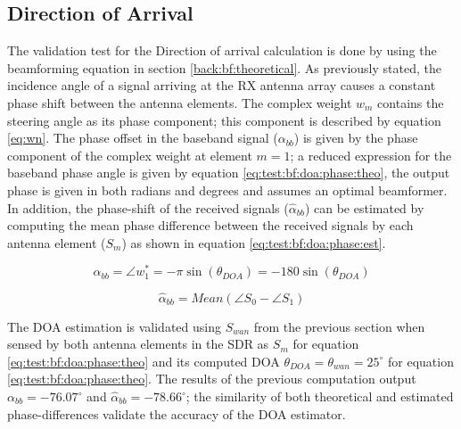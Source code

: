 \documentclass[12pt,a4paper]{report}
\begin{document}
\subsection{Direction of Arrival} \label{test:bf:rx:doa}
The validation test for the Direction of arrival calculation is done by using the beamforming equation in section \ref{back:bf:theoretical}. As previously stated, the incidence angle of a signal arriving at the RX antenna array causes a constant phase shift between the antenna elements. The complex weight $w_m$ contains the steering angle as its phase component; this component is described by equation \ref{eq:wn}. The phase offset in the baseband signal ($\alpha_{bb}$) is given by the phase component of the complex weight at element $m=1$; a reduced expression for the baseband phase angle is given by equation \ref{eq:test:bf:doa:phase:theo}, the output phase is given in both radians and degrees and assumes an optimal beamformer. In addition, the phase-shift of the received signals ($\hat{\alpha}_{bb}$) can be estimated by computing the mean phase difference between the received signals by each antenna element ($S_m$)  as shown in equation \ref{eq:test:bf:doa:phase:est}. 

\begin{equation}
    \alpha_{bb} = \angle{w_1^*} = -\pi \sin(\theta_{DOA}) = - 180 \sin(\theta_{DOA})
    \label{eq:test:bf:doa:phase:theo}
\end{equation}

\begin{equation}
    \hat{\alpha}_{bb} = Mean(\angle{S_0} - \angle{S_1})
    \label{eq:test:bf:doa:phase:est}
\end{equation}

The DOA estimation is validated using $S_{wan}$ from the previous section when sensed by both antenna elements in the SDR as $S_m$ for equation \ref{eq:test:bf:doa:phase:theo} and its computed DOA $\theta_{DOA} = \theta_{wan} = 25^\circ$ for equation \ref{eq:test:bf:doa:phase:theo}. The results of the previous computation output $\alpha_{bb} = -76.07^\circ$ and $\hat{\alpha}_{bb} = -78.66^\circ$; the similarity of both theoretical and estimated phase-differences validate the accuracy of the DOA estimator.
\end{document}
